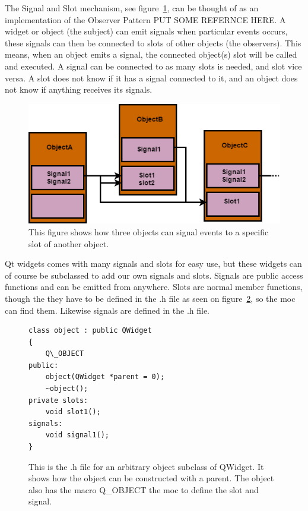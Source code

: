 The Signal and Slot mechanism, see figure~\ref{fig:SignalAndSlots}, can be thought of as an implementation of the Observer Pattern PUT SOME REFERNCE HERE. A widget or object (the subject) can emit signals when particular events occurs, these signals can then be connected to slots of other objects (the observers). This means, when an object emits a signal, the connected object(s) slot will be called and executed. A signal can be connected to as many slots is needed, and slot vice versa. A slot does not know if it has a signal connected to it, and an object does not know if anything receives its signals.   

\begin{figure}[h]
	\centering
	\includegraphics[scale=0.55]{Figures/SignalsAndSlots.png}
	\caption{This figure shows how three objects can signal events to a specific slot of another object.}
	\label{fig:SignalAndSlots}
\end{figure}

Qt widgets comes with many signals and slots for easy use, but these widgets can of course be subclassed to add our own signals and slots. Signals are public access functions and can be emitted from anywhere. Slots are normal member functions, though the they have to be defined in the .h file as seen on figure~\ref{fig:subClassQWidget}, so the moc can find them. Likewise signals are defined in the .h file.

\begin{figure}[h]
\centering
\lstset{language=C++} 
\begin{lstlisting}[frame=single] 
class object : public QWidget
{
	Q\_OBJECT
public:
	object(QWidget *parent = 0);
	~object();
private slots:
	void slot1();
signals:
	void signal1();
}
\end{lstlisting}
\caption{This is the .h file for an arbitrary object subclass of QWidget. It shows how the object can be constructed with a parent. The object also has the macro Q\_OBJECT the moc to define the slot and signal.}
\label{fig:subClassQWidget} 	
\end{figure}

